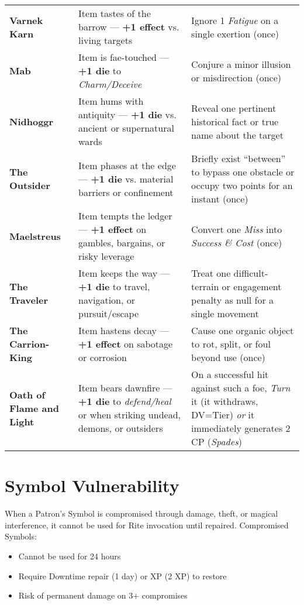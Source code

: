 \documentclass[12pt,twoside]{book}
\begin{document}
\begin{table}[htbp]
\begin{tabular}{>{\bfseries}p{3.2cm} >{\raggedright\arraybackslash}p{6.1cm} >{\raggedright\arraybackslash}p{6.1cm}}
Varnek Karn & Item tastes of the barrow — \textbf{+1 effect} vs. living targets & Ignore 1 \emph{Fatigue} on a single exertion (once) \\
Mab & Item is fae-touched — \textbf{+1 die} to \emph{Charm/Deceive} & Conjure a minor illusion or misdirection (once) \\
Nidhoggr & Item hums with antiquity — \textbf{+1 die} vs. ancient or supernatural wards & Reveal one pertinent historical fact or true name about the target \\
The Outsider & Item phases at the edge — \textbf{+1 die} vs. material barriers or confinement & Briefly exist “between” to bypass one obstacle or occupy two points for an instant (once) \\
Maelstreus & Item tempts the ledger — \textbf{+1 effect} on gambles, bargains, or risky leverage & Convert one \emph{Miss} into \emph{Success \& Cost} (once) \\
The Traveler & Item keeps the way — \textbf{+1 die} to travel, navigation, or pursuit/escape & Treat one difficult-terrain or engagement penalty as null for a single movement \\
The Carrion-King & Item hastens decay — \textbf{+1 effect} on sabotage or corrosion & Cause one organic object to rot, split, or foul beyond use (once) \\
Oath of Flame and Light & Item bears dawnfire — \textbf{+1 die} to \emph{defend/heal} or when striking undead, demons, or outsiders & On a successful hit against such a foe, \emph{Turn} it (it withdraws, DV=Tier) \emph{or} it immediately generates 2 CP (\emph{Spades}) \\
\bottomrule
\end{tabular}
\end{table}

\section*{Symbol Vulnerability}

When a Patron's Symbol is compromised through damage, theft, or magical interference, it cannot be used for Rite invocation until repaired. Compromised Symbols:
\begin{itemize}
\item Cannot be used for 24 hours
\item Require Downtime repair (1 day) or XP (2 XP) to restore
\item Risk of permanent damage on 3+ compromises
\end{itemize}
\end{document}
